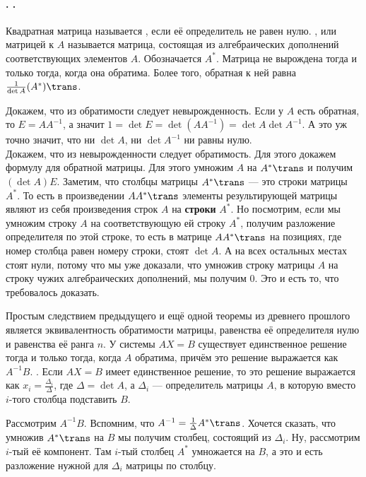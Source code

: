 \documentclass{article}
\begin{document}
    \paragraph{. .}
    \begin{itemize}
        \dfn Квадратная матрица называется , если её определитель не равен нулю.
        \dfn {},  или  матрицей к $A$ называется матрица, состоящая из алгебраических дополнений соответствующих элементов $A$. Обозначается $A^*$.
        \thm Матрица не вырождена тогда и только тогда, когда она обратима. Более того, обратная к ней равна $\frac1{\det A}(A^*)\trans$.
        \begin{Proof}
            Докажем, что из обратимости следует невырожденность. Если у $A$ есть обратная, то $E=AA^{-1}$, а значит $1=\det E=\det(AA^{-1})=\det A\det A^{-1}$. А это уж точно значит, что ни $\det A$, ни $\det A^{-1}$ ни равны нулю.\\
            Докажем, что из невырожденности следует обратимость. Для этого докажем формулу для обратной матрицы. Для этого умножим $A$ на ${A^*}\trans$ и получим $(\det A)E$. Заметим, что столбцы матрицы ${A^*}\trans$ --- это строки матрицы $A^*$. То есть в произведении $A{A^*}\trans$ элементы результирующей матрицы являют из себя произведения строк $A$ на \textbf{строки} $A^*$. Но посмотрим, если мы умножим строку $A$ на соответствующую ей строку $A^*$, получим разложение определителя по этой строке, то есть в матрице $A{A^*}\trans$ на позициях, где номер столбца равен номеру строки, стоят $\det A$. А на всех остальных местах стоят нули, потому что мы уже доказали, что умножив строку матрицы $A$ на строку чужих алгебраических дополнений, мы получим 0. Это и есть то, что требовалось доказать.
        \end{Proof}
        \thm Простым следствием предыдущего и ещё одной теоремы из древнего прошлого является эквивалентность обратимости матрицы, равенства её определителя нулю и равенства её ранга $n$.
        \thm У системы $AX=B$ существует единственное решение тогда и только тогда, когда $A$ обратима, причём это решение выражается как $A^{-1}B$.
        \thm {}. Если $AX=B$ имеет единственное решение, то это решение выражается как $x_i=\frac{\Delta_i}\Delta$, где $\Delta=\det A$, а $\Delta_i$ --- определитель матрицы $A$, в которую вместо $i$-того столбца подставить $B$.
        \begin{Proof}
            Рассмотрим $A^{-1}B$. Вспомним, что $A^{-1}=\frac1\Delta{A^*}\trans$. Хочется сказать, что умножив ${A^*}\trans$ на $B$ мы получим столбец, состоящий из $\Delta_i$. Ну, рассмотрим $i$-тый её компонент. Там $i$-тый столбец $A^*$ умножается на $B$, а это и есть разложение нужной для $\Delta_i$ матрицы по столбцу.
        \end{Proof}
    \end{itemize}
\end{document}
